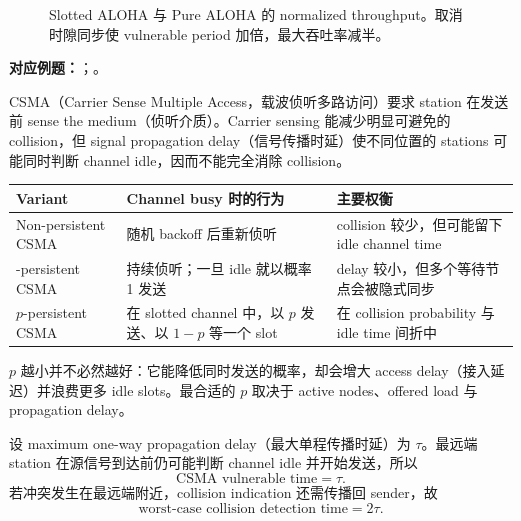 \begin{figure}[htbp]
  \centering
  \resizebox{0.88\textwidth}{!}{}
  \caption{Slotted ALOHA 与 Pure ALOHA 的 normalized throughput。取消时隙同步使 vulnerable period 加倍，最大吞吐率减半。}
  \label{fig:sc2008-l03-aloha-throughput}
\end{figure}

\textbf{对应例题：}；。


CSMA（Carrier Sense Multiple Access，载波侦听多路访问）要求 station 在发送前 sense the medium（侦听介质）。Carrier sensing 能减少明显可避免的 collision，但 signal propagation delay（信号传播时延）使不同位置的 stations 可能同时判断 channel idle，因而不能完全消除 collision。

\begin{center}
\small
\begin{tabularx}{\textwidth}{@{}>{\raggedright\arraybackslash}p{3.3cm}XX@{}}
  \toprule
  Variant & Channel busy 时的行为 & 主要权衡 \\
  \midrule
  Non-persistent CSMA & 随机 backoff 后重新侦听 & collision 较少，但可能留下 idle channel time \\
  1-persistent CSMA & 持续侦听；一旦 idle 就以概率 1 发送 & delay 较小，但多个等待节点会被隐式同步 \\
  $p$-persistent CSMA & 在 slotted channel 中，以 $p$ 发送、以 $1-p$ 等一个 slot & 在 collision probability 与 idle time 间折中 \\
  \bottomrule
\end{tabularx}
\end{center}

$p$ 越小并不必然越好：它能降低同时发送的概率，却会增大 access delay（接入延迟）并浪费更多 idle slots。最合适的 $p$ 取决于 active nodes、offered load 与 propagation delay。


设 maximum one-way propagation delay（最大单程传播时延）为 $\tau$。最远端 station 在源信号到达前仍可能判断 channel idle 并开始发送，所以
\[
  \boxed{\text{CSMA vulnerable time}=\tau}.
\]
若冲突发生在最远端附近，collision indication 还需传播回 sender，故
\[
  \boxed{\text{worst-case collision detection time}=2\tau}.
\]


